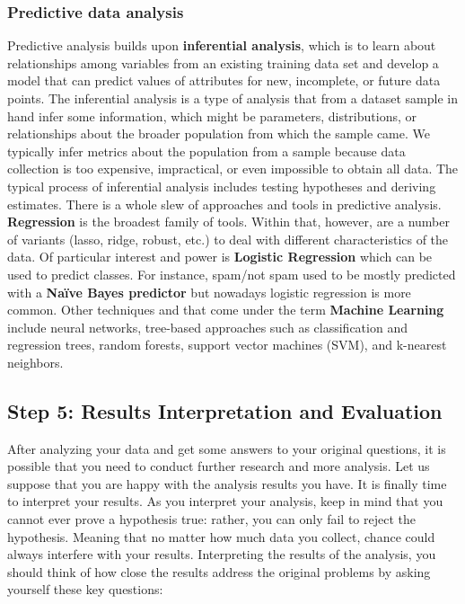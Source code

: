 \documentclass[
]{book}
\begin{document}
\hypertarget{predictive}{%
\subsubsection*{\texorpdfstring{\textbf{Predictive data analysis }}{Predictive data analysis }}\label{predictive}}


Predictive analysis builds upon \textbf{inferential analysis}, which is to learn about relationships among variables from an existing training data set and develop a model that can predict values of attributes for new, incomplete, or future data points. The inferential analysis is a type of analysis that from a dataset sample in hand infer some information, which might be parameters, distributions, or relationships about the broader population from which the sample came. We typically infer metrics about the population from a sample because data collection is too expensive, impractical, or even impossible to obtain all data. The typical process of inferential analysis includes testing hypotheses and deriving estimates.
There is a whole slew of approaches and tools in predictive analysis. \textbf{Regression} is the broadest family of tools. Within that, however, are a number of variants (lasso, ridge, robust, etc.) to deal with different characteristics of the data. Of particular interest and power is \textbf{Logistic Regression} which can be used to predict classes. For instance, spam/not spam used to be mostly predicted with a \textbf{Naïve Bayes predictor} but nowadays logistic regression is more common. Other techniques and that come under the term \textbf{Machine Learning} include neural networks, tree-based approaches such as classification and regression trees, random forests, support vector machines (SVM), and k-nearest neighbors.

\hypertarget{step-5-results-interpretation-and-evaluation}{%
\subsection*{Step 5: Results Interpretation and Evaluation}\label{step-5-results-interpretation-and-evaluation}}


After analyzing your data and get some answers to your original questions, it is possible that you need to conduct further research and more analysis. Let us suppose that you are happy with the analysis results you have. It is finally time to interpret your results. As you interpret your analysis, keep in mind that you cannot ever prove a hypothesis true: rather, you can only fail to reject the hypothesis. Meaning that no matter how much data you collect, chance could always interfere with your results. Interpreting the results of the analysis, you should think of how close the results address the original problems by asking yourself these key questions:
\end{document}
